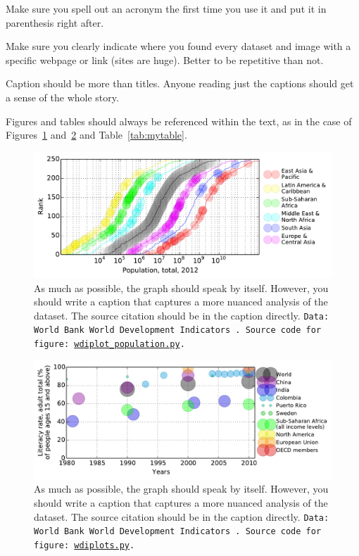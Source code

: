 \documentclass[fontsize=11pt, twocolumn]{article}
\begin{document}
Make sure you spell out an acronym the first time you use it and put it in parenthesis right after.

Make sure you clearly indicate where you found every dataset and image with a specific webpage or link (sites are huge). Better to be repetitive than not.

Caption should be more than titles. Anyone reading just the captions should get a sense of the whole story.

Figures and tables should always be referenced within the text, as in the case of Figures~\ref{fig:myfigure} and~\ref{fig:myfigure2} and Table~\ref{tab:mytable}.

\begin{figure}
\centering 
\includegraphics[width=\textwidth]{Populati2012.pdf}\caption{\label{fig:myfigure}As much as possible, the graph should speak by itself. However, you should write a caption that captures a more nuanced analysis of the dataset. The source citation should be in the caption directly. {\tt Data: World Bank World Development Indicators~\cite{wdi}. Source code for figure:~\href{https://github.com/jabb1123/RADical/blob/master/Oscar/wdiplot_population.py}{wdiplot\_population.py}.}} 
\end{figure}

\begin{figure}
\centering 
\includegraphics[width=\textwidth]{Literacy.pdf}\caption{\label{fig:myfigure2}As much as possible, the graph should speak by itself. However, you should write a caption that captures a more nuanced analysis of the dataset. The source citation should be in the caption directly. {\tt Data: World Bank World Development Indicators~\cite{wdi}. Source code for figure:~\href{https://github.com/jabb1123/RADical/blob/master/Oscar/wdiplots.py}{wdiplots.py}.}}
\end{figure}
\end{document}
